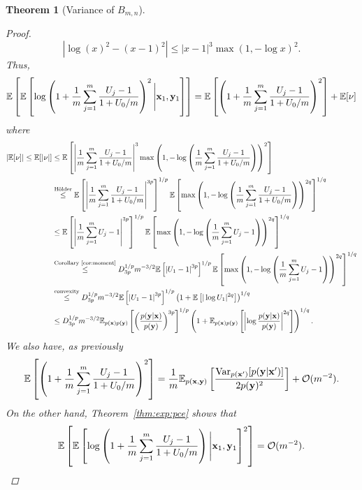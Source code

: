 \documentclass[a4paper, 10pt]{report}
\theoremstyle{plain}
\newtheorem{theorem}{Theorem}[chapter]
\begin{document}
\begin{theorem}[Variance of $B_{m,n}$]
\begin{proof}
\begin{equation}
			|\log(x)^2 - (x-1)^2| \le |x-1|^3 \max(1,-\log x)^2.
			\end{equation}
			Thus,
			\begin{equation}
			\mathbb{E}\left[ \mathbb{E}\left[ \log\left(1 + \frac{1}{m}\sum_{j=1}^m \frac{U_j - 1}{1 + U_0/m} \right)^2 \Bigg{|} {\mathbf{x}}_1,{\mathbf{y}}_1 \right] \right] = \mathbb{E}\left[ \left(1 + \frac{1}{m}\sum_{j=1}^m \frac{U_j - 1}{1 + U_0/m} \right)^2 \right] + \mathbb{E}[\nu]
			\end{equation}
			where 
			\begin{align}
			\left|\mathbb{E}[\nu]\right| \le \mathbb{E}[|\nu|] &\le \mathbb{E}\left[ \left|\frac{1}{m} \sum_{j=1}^m \frac{U_j -1}{1 + U_0/m} \right|^3 \max\left(1, -\log \left( \frac{1}{m} \sum_{j=1}^m \frac{U_j -1}{1 + U_0/m} \right)\right)^2  \right] \\
			&\overset{\text{H\"{o}lder}}{\le} \mathbb{E}\left[ \left|\frac{1}{m} \sum_{j=1}^m \frac{U_j -1}{1 + U_0/m} \right|^{3p} \right]^{1/p} \mathbb{E}\left[ \max\left(1, -\log \left( \frac{1}{m} \sum_{j=1}^m \frac{U_j -1}{1 + U_0/m} \right)\right)^{2q}  \right]^{1/q}\\
			&\le \mathbb{E}\left[ \left|\frac{1}{m} \sum_{j=1}^m {U_j -1} \right|^{3p} \right]^{1/p} \mathbb{E}\left[ \max\left(1, -\log \left( \frac{1}{m} \sum_{j=1}^m {U_j -1} \right)\right)^{2q}  \right]^{1/q} \\
			&\overset{\text{Corollary~\ref{cor:moment}}}{\le} D_{3p}^{1/p}m^{-3/2}\mathbb{E}\left[ \left|U_1 - 1\right|^{3p} \right]^{1/p} \mathbb{E}\left[ \max\left(1, -\log \left( \frac{1}{m} \sum_{j=1}^m {U_j -1} \right)\right)^{2q}  \right]^{1/q} \\
			&\overset{\text{convexity}}{\le}D_{3p}^{1/p}m^{-3/2}\mathbb{E}\left[ \left|U_1 - 1\right|^{3p} \right]^{1/p}  \left( 1 + \mathbb{E}\left[|\log U_1|^{2q} \right]\right)^{1/q} \\
			&\le D_{3p}^{1/p}m^{-3/2}\mathbb{E}_{p({\mathbf{x}})p({\mathbf{y}})}\left[ \left(\frac{p({\mathbf{y}}|{\mathbf{x}})}{p({\mathbf{y}})}\right)^{3p} \right]^{1/p}  \left( 1 + \mathbb{E}_{p({\mathbf{x}})p({\mathbf{y}})}\left[\left|\log \frac{p({\mathbf{y}}|{\mathbf{x}})}{p({\mathbf{y}})}\right|^{2q} \right]\right)^{1/q} .
			\end{align}
			We also have, as previously
			\begin{equation}
			\mathbb{E}\left[ \left(1 + \frac{1}{m}\sum_{j=1}^m \frac{U_j - 1}{1 + U_0/m} \right)^2 \right] = \frac{1}{m}\mathbb{E}_{p({\mathbf{x}},{\mathbf{y}})}\left[  \frac{\mathrm{Var}_{p({\mathbf{x}}')}[p({\mathbf{y}}|{\mathbf{x}}')]}{2p({\mathbf{y}})^2} \right] + \mathcal{O}(m^{-2}).
			\end{equation}
			On the other hand, Theorem~\ref{thm:exp:pce} shows that
			\begin{equation}
			\mathbb{E}\left[ \mathbb{E}\left[ \log\left(1 + \frac{1}{m}\sum_{j=1}^m \frac{U_j - 1}{1 + U_0/m} \right) \Bigg{|} {\mathbf{x}}_1,{\mathbf{y}}_1 \right]^2 \right] = \mathcal{O}(m^{-2}).
			\end{equation}
			

\end{proof}
\end{theorem}
\end{document}
